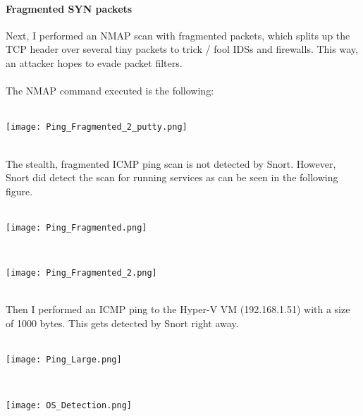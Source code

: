 \paragraph{Fragmented SYN packets}
Next, I performed an NMAP scan with fragmented packets, which splits up the TCP header over several tiny packets to trick / fool IDSs and firewalls. This way, an attacker hopes to evade packet filters. \\ \\
The NMAP command executed is the following: \\ \\
\noindent\begin{minipage}{\textwidth}
    \centering
    \texttt{[image: Ping\_Fragmented\_2\_putty.png]}
\end{minipage}
$\;$ \\ \\
The stealth, fragmented ICMP ping scan is not detected by Snort. However, Snort did detect the scan for running services as can be seen in the following figure. \\ \\
\noindent\begin{minipage}{\textwidth}
    \centering
    \texttt{[image: Ping\_Fragmented.png]}
\end{minipage}
$\;$ \\ \\
\noindent\begin{minipage}{\textwidth}
    \centering
    \texttt{[image: Ping\_Fragmented\_2.png]}
\end{minipage}
$\;$ \\ \\
Then I performed an ICMP ping to the Hyper-V VM (192.168.1.51) with a size of 1000 bytes. This gets detected by Snort right away. \\ \\
\noindent\begin{minipage}{\textwidth}
    \centering
    \texttt{[image: Ping\_Large.png]}
\end{minipage}
$\;$ \\ \\
\noindent\begin{minipage}{\textwidth}
    \centering
    \texttt{[image: OS\_Detection.png]}
\end{minipage}

